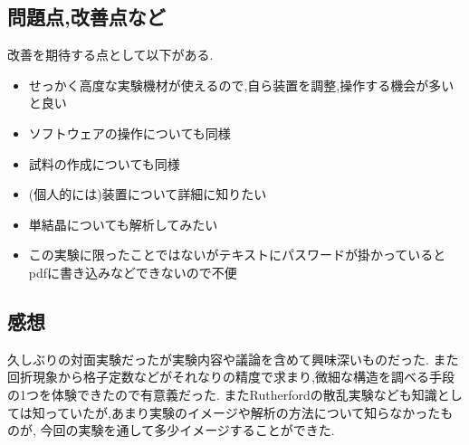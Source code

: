 \subsection{問題点,改善点など}
改善を期待する点として以下がある.
\begin{itemize}
  \item せっかく高度な実験機材が使えるので,自ら装置を調整,操作する機会が多いと良い
  \item ソフトウェアの操作についても同様
  \item 試料の作成についても同様
  \item (個人的には)装置について詳細に知りたい
  \item 単結晶についても解析してみたい
  \item この実験に限ったことではないがテキストにパスワードが掛かっているとpdfに書き込みなどできないので不便
\end{itemize}
\subsection{感想}
久しぶりの対面実験だったが実験内容や議論を含めて興味深いものだった.
また回折現象から格子定数などがそれなりの精度で求まり,微細な構造を調べる手段の1つを体験できたので有意義だった.
またRutherfordの散乱実験なども知識としては知っていたが,あまり実験のイメージや解析の方法について知らなかったものが,
今回の実験を通して多少イメージすることができた.